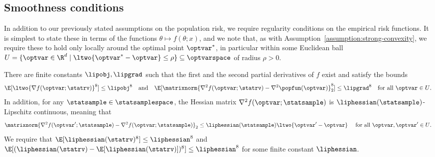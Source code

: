 \documentclass[11pt,twoside]{article}
\theoremstyle{definition}
\begin{document}
\subsection{Smoothness conditions}

In addition to our previously stated assumptions on the population
risk, we require regularity conditions on the empirical risk
functions.  It is simplest to state these in terms of the functions
$\theta \mapsto f(\theta; x)$, and we note that, as with
Assumption~\ref{assumption:strong-convexity}, we require these to hold
only locally around the optimal point $\optvar^*$, in particular
within some Euclidean ball \mbox{$U = \{\optvar \in \R^d \mid
  \ltwo{\optvar^* - \optvar} \le \rho\} \subseteq \optvarspace$} of
radius $\rho > 0$.

%
\begin{assumption}[Smoothness]
\label{assumption:smoothness}
There are finite constants $\lipobj, \lipgrad$ such that the first and
the second partial derivatives of $f$ exist and satisfy the bounds
  \begin{equation*}
    \E[\ltwo{\nabla f(\optvar; \statrv)}^8] \leq \lipobj^8
    ~~~\mbox{and} ~~~ \E[\matrixnorm{\nabla^2 f(\optvar; \statrv) -
        \nabla^2 \popfun(\optvar)}_2^8] \le \lipgrad^8 \quad \mbox{for
      all $\optvar \in U$.}
  \end{equation*}
 In addition, for any $\statsample \in \statsamplespace$, the Hessian
 matrix $\nabla^2 f(\optvar; \statsample)$ is
 $\liphessian(\statsample)$-Lipschitz continuous, meaning that
\begin{align}
\label{EqnHessLip}
\matrixnorm{\nabla^2 f(\optvar'; \statsample)-\nabla^2 f(\optvar;
  \statsample)}_2 \leq \liphessian(\statsample) \ltwo{\optvar' -
  \optvar} \quad \mbox{ for all $\optvar, \optvar' \in U$.}
\end{align}
We require that $\E[\liphessian(\statrv)^8] \le \liphessian^8$ and
$\E[(\liphessian(\statrv) - \E[\liphessian(\statrv)])^8] \le
\liphessian^8$ for some finite constant $\liphessian$.
\end{assumption}
\end{document}
